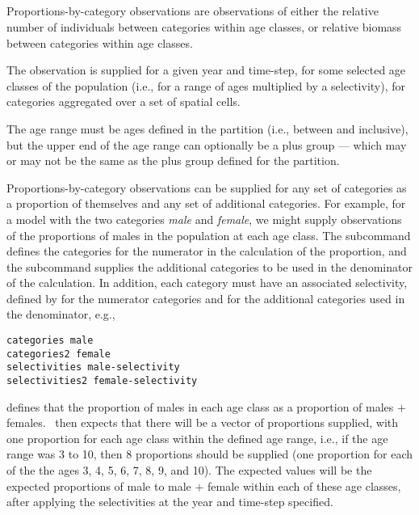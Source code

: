 {{{{\subsection{\label{sec:proportions-by-category}}
Proportions-by-category observations are observations of either the relative number of individuals between categories within age classes, or relative biomass between categories within age classes. 

The observation is supplied for a given year and time-step, for some selected age classes of the population (i.e., for a range of ages multiplied by a selectivity), for categories aggregated over a set of spatial cells. 

The age range must be ages defined in the partition (i.e., between  and  inclusive), but the upper end of the age range can optionally be a plus group --- which may or may not be the same as the plus group defined for the partition. 

Proportions-by-category observations can be supplied for any set of categories as a proportion of themselves and any set of additional categories. For example, for a model with the two categories \emph{male} and \emph{female}, we might supply observations of the proportions of males in the population at each age class. The subcommand  defines the categories for the numerator in the calculation of the proportion, and the subcommand  supplies the additional categories to be used in the denominator of the calculation. In addition, each category must have an associated selectivity, defined by  for the numerator categories and  for the additional categories used in the denominator, e.g., 

{\small{\begin{verbatim}
categories male
categories2 female
selectivities male-selectivity
selectivities2 female-selectivity
\end{verbatim}}}

defines that the proportion of males in each age class as a proportion of males $+$ females. \CNAME\ then expects that there will be a vector of proportions supplied, with one proportion for each age class within the defined age range, i.e., if the age range was 3 to 10, then 8 proportions should be supplied (one proportion for each of the the ages 3, 4, 5, 6, 7, 8, 9, and 10). The expected values will be the expected proportions of male to male $+$ female within each of these age classes, after applying the selectivities at the year and time-step specified. 

}}}}
